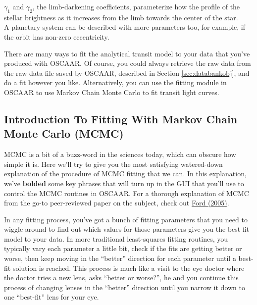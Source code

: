 \documentclass[a4paper]{article}
\begin{document}
$\gamma_1$ and $\gamma_2$, the limb-darkening coefficients, parameterize how the profile of the stellar brightness as it increases from the limb towards the center of the star.\\

\noindent A planetary system can be described with more parameters too, for example, if the orbit has non-zero eccentricity. 

There are many ways to fit the analytical transit model to your data that you've produced with OSCAAR. Of course, you could always retrieve the raw data from the raw data file saved by OSCAAR, described in Section \ref{sec:databankobj}, and do a fit however you like. Alternatively, you can use the fitting module in OSCAAR to use Markov Chain Monte Carlo to fit transit light curves.

\subsection{Introduction To Fitting With Markov Chain Monte Carlo (MCMC)}
MCMC is a bit of a buzz-word in the sciences today, which can obscure how simple it is. Here we'll try to give you the most satisfying watered-down explanation of the procedure of MCMC fitting that we can. In this explanation, we've \textbf{bolded} some key phrases that will turn up in the GUI that you'll use to control the MCMC routines in OSCAAR. For a thorough explanation of MCMC from the go-to peer-reviewed paper on the subject, check out \href{http://adsabs.harvard.edu/abs/2005AJ....129.1706F}{Ford (2005)}. 

In any fitting process, you've got a bunch of fitting parameters that you need to wiggle around to find out which values for those parameters give you the best-fit model to your data. In more traditional least-squares fitting routines, you typically vary each parameter a little bit, check if the fits are getting better or worse, then keep moving in the ``better'' direction for each parameter until a best-fit solution is reached. This process is much like a visit to the eye doctor where the doctor tries a new lens, asks ``better or worse?'', he and you continue this process of changing lenses in the ``better'' direction until you narrow it down to one ``best-fit'' lens for your eye. 
\end{document}
